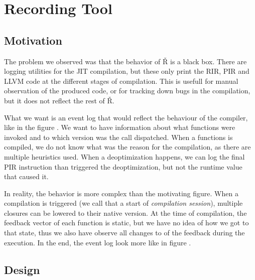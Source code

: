 \chapter{Recording Tool}

\begin{chapterabstract}
	\todoadd
\end{chapterabstract}


\section{Motivation}

The problem we observed was that the behavior of Ř is a black box. There are logging utilities for the JIT compilation, but these only print the RIR, PIR and LLVM code at the different stages of compilation. This is usefull for manual observation of the produced code, or for tracking down bugs in the compilation, but it does not reflect the rest of Ř.

What we want is an event log that would reflect the behaviour of the compiler, like in the figure \todoadd. We want to have information about what functions were invoked and to which version was the call dispatched. When a functions is compiled, we do not know what was the reason for the compilation, as there are multiple heuristics used. When a deoptimization happens, we can log the final PIR instruction than triggered the deoptimization, but not the runtime value that caused it.

In reality, the behavior is more complex than the motivating figure. When a compilation is triggered (we call that a start of \textit{compilation session}), multiple closures can be lowered to their native version. At the time of compilation, the feedback vector of each function is static, but we have no idea of how we got to that state, thus we also have observe all changes to of the feedback during the execution. In the end, the event log look more like in figure \todoadd.

\section{Design}

